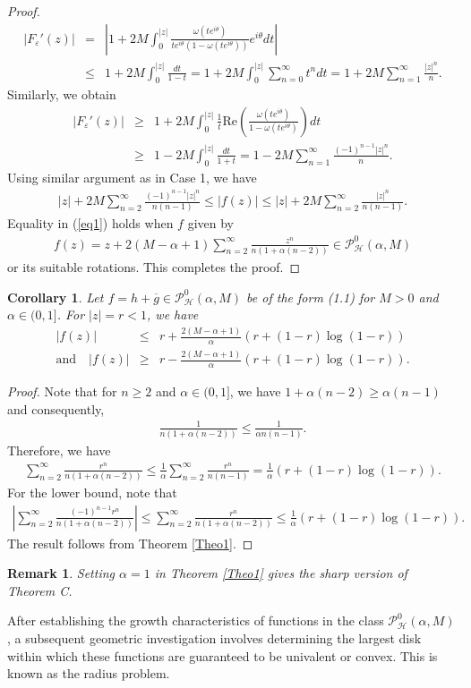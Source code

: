 \documentclass[11pt,reqno]{amsart}
\newtheorem{cor}{Corollary}[section]
\newtheorem{rem}{Remark}[section]
\newtheorem{open problem}{Open problem}[section]
\newcommand{\beas}{\begin{eqnarray*}}
\newcommand{\eeas}{\end{eqnarray*}}
\renewcommand{\epsilon}{\varepsilon}
\numberwithin{equation}{section}
\begin{document}
\begin{proof}
\beas |F_{\epsilon}'(z)|&=&\left|1+2M\int_{0}^{|z|}\frac{\omega(te^{i\theta})}{ te^{i\theta}(1-\omega(te^{i\theta}))} e^{i\theta}dt\right|\\
&\leq& 1+2M\int_{0}^{|z|}\frac{dt}{1-t}=1+2M\int_{0}^{|z|}\sum_{n=0}^\infty t^ndt=1+2M\sum_{n=1}^\infty \frac{|z|^{n}}{n}.
\eeas
Similarly, we obtain 
\beas |F_{\epsilon}'(z)|&\geq& 1+2M\int_{0}^{|z|}\frac{1}{t}\text{Re}\left(\frac{\omega(te^{i\theta})}{1-\omega(te^{i\theta})}\right) dt\\[2mm]
&\geq& 1-2M\int_{0}^{|z|}\frac{dt}{1+t}=1-2M\sum_{n=1}^\infty \frac{(-1)^{n-1}|z|^{n}}{n}.\eeas
Using similar argument as in \textrm{Case 1}, we have 
\beas |z|+2M\sum_{n=2}^{\infty}\frac{(-1)^{n-1}|z|^{n}}{n(n-1)}\leq |f(z)|\leq |z|+2M\sum_{n=2}^{\infty}\frac{|z|^n}{n(n-1)}.\eeas
Equality in (\ref{eq1}) holds when $f$ given by
\beas f(z)=z+2(M-\alpha+1)\sum_{n=2}^{\infty}\frac{z^n}{n(1+\alpha (n-2))}\in\mathcal{P}_{\mathcal{H}}^0(\alpha,M)\eeas
or its suitable rotations.
This completes the proof.
\end{proof}
\begin{cor} \label{CTheo1}
Let $f = h + \overline{g} \in \mathcal{P}_{\mathcal{H}}^{0}(\alpha,M)$ be of the form (1.1) for $M > 0$ and $\alpha \in (0,1]$. For $|z| = r < 1$, we have
\beas
|f(z)| &\leq& r + \frac{2(M-\alpha+1)}{\alpha} \left(r + (1-r)\log(1-r)\right)\\\text{and}\quad
|f(z)| &\geq&r - \frac{2(M-\alpha+1)}{\alpha} \left(r + (1-r)\log(1-r)\right).\eeas
\end{cor}
\begin{proof}
Note that for $n \geq 2$ and $\alpha \in (0,1]$, we have $1 + \alpha(n-2) \geq \alpha(n-1)$ and consequently,
\beas
\frac{1}{n(1+\alpha(n-2))} \leq \frac{1}{\alpha n(n-1)}.\eeas
Therefore, we have
\beas
\sum_{n=2}^{\infty} \frac{r^n}{n(1+\alpha(n-2))} \leq \frac{1}{\alpha} \sum_{n=2}^{\infty} \frac{r^n}{n(n-1)} = \frac{1}{\alpha}\left( r+(1-r) \log (1-r)\right).\eeas
For the lower bound, note that
\beas
\left|\sum_{n=2}^{\infty}\frac{(-1)^{n-1}r^{n}}{n(1+\alpha(n-2))}\right| \leq \sum_{n=2}^{\infty}\frac{r^{n}}{n(1+\alpha(n-2))} \leq \frac{1}{\alpha} \left(r + (1-r)\log(1-r)\right).\eeas
The result follows from \textrm{Theorem} \ref{Theo1}.
\end{proof}
\begin{rem} Setting $\alpha=1$ in \textrm{Theorem \ref{Theo1}} gives the sharp version of \textrm{Theorem C}. \end{rem}
After establishing the growth characteristics of functions in the class $\mathcal{P}_{\mathcal{H}}^0(\alpha,M)$, a subsequent geometric investigation involves determining the largest disk within which these functions are guaranteed to be univalent or convex. This is known as the radius problem.
\end{document}
